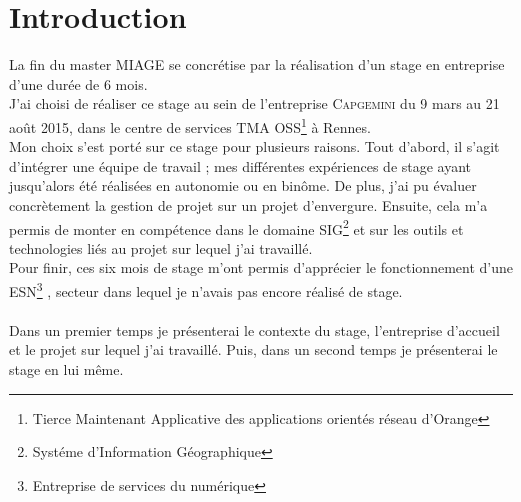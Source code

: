 \chapter*{Introduction}
La fin du master MIAGE se concrétise par la réalisation d’un stage en entreprise d’une durée de 6 mois.
\\J’ai choisi de réaliser ce stage au sein de l’entreprise \textsc{Capgemini} du 9 mars au 21 août 2015,
dans le centre de services TMA OSS\footnote{Tierce Maintenant Applicative des applications orientés réseau d'Orange} à Rennes.
\\Mon choix s’est porté sur ce stage pour plusieurs raisons.
 Tout d’abord, il s’agit d’intégrer une équipe de travail ; mes différentes expériences de stage ayant jusqu’alors été réalisées en
autonomie ou en binôme.
De plus, j’ai pu évaluer concrètement la gestion de projet sur un
projet d’envergure.
  Ensuite, cela m’a permis de monter en compétence dans le domaine SIG\footnote{Systéme d'Information Géographique} et
sur les outils et technologies liés au projet sur lequel j'ai travaillé.
\\Pour finir, ces six mois de stage m’ont permis d’apprécier le
fonctionnement d’une ESN\footnote{Entreprise de services du numérique}
, secteur dans lequel je n’avais pas encore réalisé de stage.
\\\\
Dans un premier temps je présenterai le contexte du stage, l'entreprise d'accueil et le projet sur lequel j'ai travaillé.
Puis, dans un second temps je présenterai le stage en lui même.
